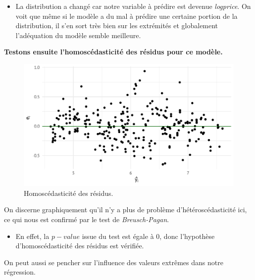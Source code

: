 \documentclass[
  12pt,
]{report}
\providecommand{\tightlist}{%
  \setlength{\itemsep}{0pt}\setlength{\parskip}{0pt}}\usepackage{longtable,booktabs,array}
\begin{document}
\begin{itemize}
\tightlist
\item
  La distribution a changé car notre variable à prédire est devenue
  \emph{logprice}. On voit que même si le modèle a du mal à prédire une
  certaine portion de la distribution, il s'en sort très bien sur les
  extrémités et globalement l'adéquation du modèle semble meilleure.
\end{itemize}

\textbf{Testons ensuite l'homoscédasticité des résidus pour ce modèle.}

\begin{figure}[H]

{\centering \includegraphics{report_files/figure-pdf/log_hetero-1.pdf}

}

\caption{Homoscédasticité des résidus.}

\end{figure}%

On discerne graphiquement qu'il n'y a plus de problème
d'hétéroscédasticité ici, ce qui nous est confirmé par le test de
\emph{Breusch-Pagan}.

\begin{itemize}
\tightlist
\item
  En effet, la \(p-value\) issue du test est égale à 0, donc l'hypothèse
  d'homoscédasticité des résidus est vérifiée.
\end{itemize}

On peut aussi se pencher sur l'influence des valeurs extrêmes dans notre
régression.
\end{document}
